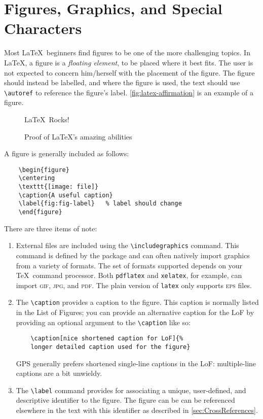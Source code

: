 \section{Figures, Graphics, and Special Characters}
\label{sec:Graphics}

Most \LaTeX\ beginners find figures to be one of the more challenging
topics.  In \LaTeX, a figure is a \emph{floating element}, to be
placed where it best fits.
The user is not expected to concern him/herself with the placement
of the figure.  The figure should instead be labelled, and where
the figure is used, the text should use \verb+\autoref+ to reference
the figure's label.
\autoref{fig:latex-affirmation} is an example of a figure.
\begin{figure}
    \centering
    \Huge{\textsf{\LaTeX\ Rocks!}}
    \caption{Proof of \LaTeX's amazing abilities}
    \label{fig:latex-affirmation}   %
\end{figure}
A figure is generally included as follows:
\begin{lstlisting}
    \begin{figure}
    \centering
    \texttt{[image: file]}
    \caption{A useful caption}
    \label{fig:fig-label}   % label should change
    \end{figure}
\end{lstlisting}
There are three items of note:
\begin{enumerate}
\item External files are included using the \verb+\includegraphics+
    command.  This command is defined by the  package
    and can often natively import graphics from a variety of formats.
    The set of formats supported depends on your \TeX\ command processor.
    Both \texttt{pdflatex} and \texttt{xelatex}, for example, can
    import \textsc{gif}, \textsc{jpg}, and \textsc{pdf}.  The plain
    version of \texttt{latex} only supports \textsc{eps} files.

\item The \verb+\caption+ provides a caption to the figure. 
    This caption is normally listed in the List of Figures; you
    can provide an alternative caption for the LoF by providing
    an optional argument to the \verb+\caption+ like so:
    \begin{lstlisting}
    \caption[nice shortened caption for LoF]{%
	longer detailed caption used for the figure}
    \end{lstlisting}
    \ac{GPS} generally prefers shortened single-line captions
    in the LoF: multiple-line captions are a bit unwieldy.

\item The \verb+\label+ command provides for associating a unique, user-defined,
    and descriptive identifier to the figure.  The figure can be
    can be referenced elsewhere in the text with this identifier
    as described in \autoref{sec:CrossReferences}.
\end{enumerate}
